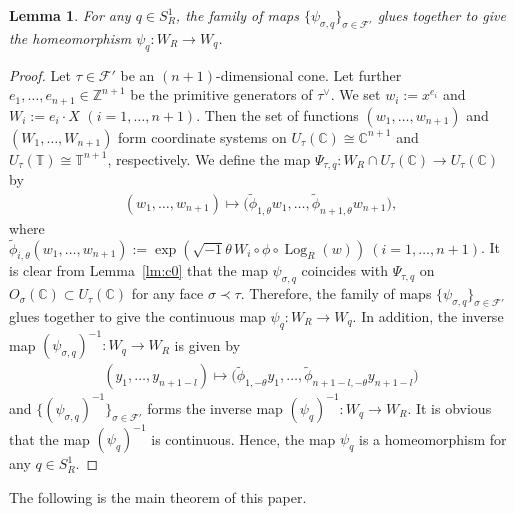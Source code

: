 \documentclass[pdftex]{sigma}
\numberwithin{equation}{section}
\newtheorem{Lemma}[Theorem]{Lemma}
\begin{document}
\begin{Lemma}\label{lm:c1}
For any $q \in S_R^1$, the family of maps $\{\psi_{\sigma,q}\}_{\sigma \in {\mathcal F}'}$ glues together to give the homeomorphism $\psi_{q} \colon W_R \to W_q$.
\end{Lemma}
\begin{proof}
Let $\tau \in {\mathcal F}'$ be an $(n+1)$-dimensional cone. Let further $e_1, \dots, e_{n+1} \in {\mathbb Z}^{n+1}$ be the primitive generators of $\tau^\vee$. We set $w_i:=x^{e_i}$ and $W_i:=e_i \cdot X$ $(i=1,\dots, n+1)$. Then the set of functions $(w_1, \dots, w_{n+1})$ and $(W_1, \dots, W_{n+1})$ form coordinate systems on $U_\tau({\mathbb C}) \cong {\mathbb C}^{n+1}$ and $U_\tau({\mathbb T}) \cong {\mathbb T}^{n+1}$, respectively. We def\/ine the map $\Psi_{\tau,q} \colon W_R \cap U_\tau({\mathbb C}) \to U_\tau({\mathbb C})$ by
\begin{gather*}
(w_1, \dots ,w_{n+1}) \mapsto \big(\tilde{\phi}_{1,\theta}w_1, \dots, \tilde{\phi}_{n+1,\theta}w_{n+1}\big),
\end{gather*}
where $\tilde{\phi}_{i,\theta}(w_1, \dots, w_{n+1}) := \exp \left(\sqrt{-1} \theta \, W_i \circ \phi \circ \operatorname{Log}_R (w) \right)\ (i=1, \dots, n+1)$. It is clear from Lemma~\ref{lm:c0} that the map $\psi_{\sigma,q}$ coincides with $\Psi_{\tau,q}$ on $O_\sigma({\mathbb C}) \subset U_\tau({\mathbb C})$ for any face \mbox{$\sigma \prec \tau$}. Therefore, the family of maps $\{\psi_{\sigma,q}\}_{\sigma \in {\mathcal F}'}$ glues together to give the continuous map \mbox{$\psi_{q} \colon W_R \to W_q$}. In addition, the inverse map $(\psi_{\sigma,q})^{-1} \colon W_q \to W_R$ is given by
\begin{gather*}
(y_1, \dots ,y_{n+1-l}) \mapsto \big(\tilde{\phi}_{1,-\theta}y_1, \dots, \tilde{\phi}_{n+1-l,-\theta}y_{n+1-l}\big)
\end{gather*}
and $\{ (\psi_{\sigma,q})^{-1}\}_{\sigma \in {\mathcal F}'}$ forms the inverse map $(\psi_q)^{-1} \colon W_q \to W_R$. It is obvious that the map $(\psi_q)^{-1}$ is continuous. Hence, the map $\psi_q$ is a homeomorphism for any $q \in S_R^1$.
\end{proof}

The following is the main theorem of this paper.
\end{document}
